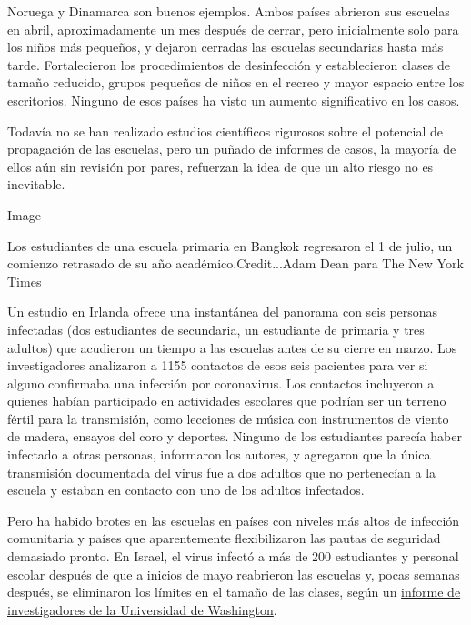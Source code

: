 Noruega y Dinamarca son buenos ejemplos. Ambos países abrieron sus
escuelas en abril, aproximadamente un mes después de cerrar, pero
inicialmente solo para los niños más pequeños, y dejaron cerradas las
escuelas secundarias hasta más tarde. Fortalecieron los procedimientos
de desinfección y establecieron clases de tamaño reducido, grupos
pequeños de niños en el recreo y mayor espacio entre los escritorios.
Ninguno de esos países ha visto un aumento significativo en los casos.

Todavía no se han realizado estudios científicos rigurosos sobre el
potencial de propagación de las escuelas, pero un puñado de informes de
casos, la mayoría de ellos aún sin revisión por pares, refuerzan la idea
de que un alto riesgo no es inevitable.

Image

Los estudiantes de una escuela primaria en Bangkok regresaron el 1 de
julio, un comienzo retrasado de su año académico.Credit...Adam Dean para
The New York Times

\href{https://www.eurosurveillance.org/content/10.2807/1560-7917.ES.2020.25.21.2000903\#html_fulltext}{Un
estudio en Irlanda ofrece una instantánea del panorama} con seis
personas infectadas (dos estudiantes de secundaria, un estudiante de
primaria y tres adultos) que acudieron un tiempo a las escuelas antes de
su cierre en marzo. Los investigadores analizaron a 1155 contactos de
esos seis pacientes para ver si alguno confirmaba una infección por
coronavirus. Los contactos incluyeron a quienes habían participado en
actividades escolares que podrían ser un terreno fértil para la
transmisión, como lecciones de música con instrumentos de viento de
madera, ensayos del coro y deportes. Ninguno de los estudiantes parecía
haber infectado a otras personas, informaron los autores, y agregaron
que la única transmisión documentada del virus fue a dos adultos que no
pertenecían a la escuela y estaban en contacto con uno de los adultos
infectados.

Pero ha habido brotes en las escuelas en países con niveles más altos de
infección comunitaria y países que aparentemente flexibilizaron las
pautas de seguridad demasiado pronto. En Israel, el virus infectó a más
de 200 estudiantes y personal escolar después de que a inicios de mayo
reabrieron las escuelas y, pocas semanas después, se eliminaron los
límites en el tamaño de las clases, según un
\href{https://globalhealth.washington.edu/sites/default/files/COVID-19\%20Schools\%20Summary\%20\%282\%29.pdf?mkt_tok=eyJpIjoiTkRreE5XWXlORFF3TXpNeCIsInQiOiJIbVNQTTVySEo0Vzk1cHVBZVVqWnFGVmR1UEJxRGdpd01mTXg4OGw3Mk5nTnpmaUoyMGt2UXIwWVZBOE5GVjIybHA5aStrbzJ3MUxsanoxamZibmlocmpSbXZyVFVoV0VHYU1aTGx0RnpsMXlmOEtXSVJqaDJsZ0RJU1BQcVZjZSJ9}{informe
de investigadores de la Universidad de Washington}.

